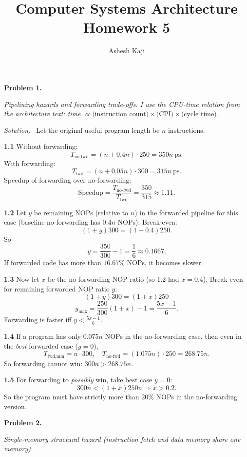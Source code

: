 \documentclass[12pt]{article}
\title{Computer Systems Architecture\\Homework 5}
\author{Ashesh Kaji}
\date{}
\newcommand{\problem}[1]{\vspace{0.8em}\noindent\textbf{Problem #1.}\vspace{0.35em}}
\newenvironment{solution}{\par\noindent\textit{Solution.}\ }{\par\vspace{1.1em}}
\newcommand{\subproblem}[1]{\par\vspace{0.45em}\noindent\textbf{#1}\quad}
\newcommand{\assigntext}[1]{\par\vspace{0.25em}\small\textit{#1}\par\vspace{0.35em}}
\begin{document}
\maketitle

\problem{1}
\assigntext{Pipelining hazards and forwarding trade-offs. I use the CPU-time relation from the architecture text: time $\propto \text{(instruction count)} \times \text{(CPI)} \times \text{(cycle time)}$.}

\begin{solution}
Let the original useful program length be $n$ instructions.

\subproblem{1.1}
Without forwarding:
\[
T_{\text{no-fwd}}=(n+0.4n)\cdot 250 = 350n\ \text{ps}.
\]
With forwarding:
\[
T_{\text{fwd}}=(n+0.05n)\cdot 300 = 315n\ \text{ps}.
\]
Speedup of forwarding over no-forwarding:
\[
\text{Speedup}=\frac{T_{\text{no-fwd}}}{T_{\text{fwd}}}=\frac{350}{315}\approx 1.11.
\]

\subproblem{1.2}
Let $y$ be remaining NOPs (relative to $n$) in the forwarded pipeline for this case (baseline no-forwarding has $0.4n$ NOPs).
Break-even:
\[
(1+y)300 = (1+0.4)250.
\]
So
\[
y = \frac{350}{300}-1 = \frac{1}{6}\approx 0.1667.
\]
If forwarded code has more than $16.67\%$ NOPs, it becomes slower.

\subproblem{1.3}
Now let $x$ be the no-forwarding NOP ratio (so 1.2 had $x=0.4$). Break-even for remaining forwarded NOP ratio $y$:
\[
(1+y)300 = (1+x)250
\]
\[
y_{\max}=\frac{250}{300}(1+x)-1=\frac{5x-1}{6}.
\]
Forwarding is faster iff $y<\frac{5x-1}{6}$.

\subproblem{1.4}
If a program has only $0.075n$ NOPs in the no-forwarding case, then even in the \emph{best} forwarded case ($y=0$),
\[
T_{\text{fwd,min}}=n\cdot 300,\quad T_{\text{no-fwd}}=(1.075n)\cdot 250=268.75n.
\]
So forwarding cannot win: $300n>268.75n$.

\subproblem{1.5}
For forwarding to \emph{possibly} win, take best case $y=0$:
\[
300n < (1+x)250n \Rightarrow x>0.2.
\]
So the program must have strictly more than $20\%$ NOPs in the no-forwarding version.
\end{solution}

\problem{2}
\assigntext{Single-memory structural hazard (instruction fetch and data memory share one memory).}
\end{document}
